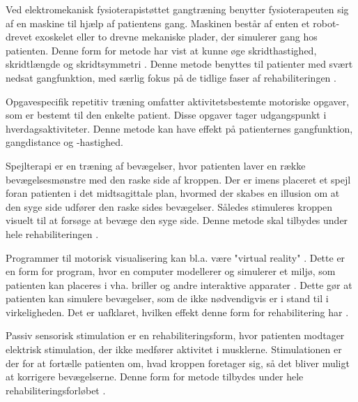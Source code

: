 Ved elektromekanisk fysioterapistøttet gangtræning benytter fysioterapeuten sig af en maskine til hjælp af patientens gang. Maskinen består af enten et robot-drevet exoskelet eller to drevne mekaniske plader, der simulerer gang hos patienten. \cite{Mehrholz2013} Denne form for metode har vist at kunne øge skridthastighed, skridtlængde og skridtsymmetri \cite{Sundhedsstyrelsen2010}. Denne metode benyttes til patienter med svært nedsat gangfunktion, med særlig fokus på de tidlige faser af rehabiliteringen \cite{Sundhedsstyrelsen2011a}.

Opgavespecifik repetitiv træning omfatter aktivitetsbestemte motoriske opgaver, som er bestemt til den enkelte patient. Disse opgaver tager udgangspunkt i hverdagsaktiviteter. Denne metode kan have effekt på patienternes gangfunktion, gangdistance og -hastighed. \cite{Sundhedsstyrelsen2010}

Spejlterapi er en træning af bevægelser, hvor patienten laver en række bevægelsesmønstre med den raske side af kroppen. Der er imens placeret et spejl foran patienten i det midtsagittale plan, hvormed der skabes en illusion om at den syge side udfører den raske sides bevægelser. Således stimuleres kroppen visuelt til at forsøge at bevæge den syge side.\cite{Thieme2012} Denne metode skal tilbydes under hele rehabiliteringen \cite{Sundhedsstyrelsen2011a}.

Programmer til motorisk visualisering kan bl.a. være "virtual reality" \cite{Sundhedsstyrelsen2010}. Dette er en form for program, hvor en computer modellerer og simulerer et miljø, som patienten kan placeres i vha. briller og andre interaktive apparater \cite{Lowood2015}. Dette gør at patienten kan simulere bevægelser, som de ikke nødvendigvis er i stand til i virkeligheden. Det er uafklaret, hvilken effekt denne form for rehabilitering har \cite{Sundhedsstyrelsen2010}.

Passiv sensorisk stimulation er en rehabiliteringsform, hvor patienten modtager elektrisk stimulation, der ikke medfører aktivitet i musklerne. Stimulationen er der for at fortælle patienten om, hvad kroppen foretager sig, så det bliver muligt at korrigere bevægelserne. \cite{Sundhedsstyrelsen2010} Denne form for metode tilbydes under hele rehabiliteringsforløbet \cite{Sundhedsstyrelsen2011a}.
%
%
